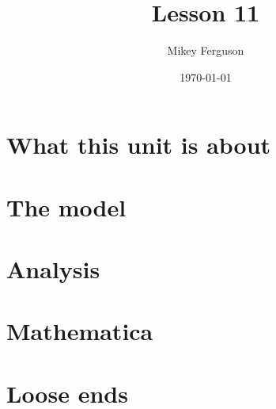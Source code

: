\documentclass[11pt]{article}
\title{Lesson 11}
\author{Mikey Ferguson}
\date{\today}
\begin{document}
\maketitle
\tableofcontents
\bigskip

\section{What this unit is about}

\section{The model}

\section{Analysis}

\section{Mathematica}

\section{Loose ends}
\end{document}
